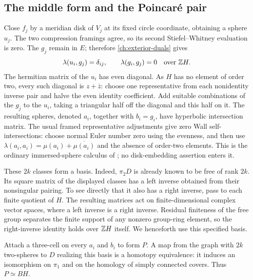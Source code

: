 \subsection{The middle form and the Poincar\'e pair}
\label{ch:duality}

Close $f_j$ by a meridian disk of $V_j$ at its fixed circle coordinate,
obtaining a sphere $u_j$.  The two compression framings agree, so its
second Stiefel--Whitney evaluation is zero.  The $g_j$ remain in $E$;
therefore \eqref{ch:exterior-duals} gives
\[
 \lambda(u_i,g_j)=\delta_{ij},\qquad \lambda(g_i,g_j)=0
 \quad\text{over }\mathbb Z H.
\]
The hermitian matrix of the $u_i$ has even diagonal.  As $H$ has no
element of order two, every such diagonal is $z+\bar z$: choose one
representative from each nonidentity inverse pair and halve the even
identity coefficient.  Add suitable combinations of the $g_j$ to the
$u_i$, taking a triangular half off the diagonal and this half on it.
The resulting spheres, denoted $a_i$, together with $b_i=g_i$, have
hyperbolic intersection matrix.  The usual framed representative
adjustments give zero Wall self-intersections: choose normal Euler
number zero using the evenness, and then use
$\lambda(a_i,a_i)=\mu(a_i)+\overline{\mu(a_i)}$ and the absence of
order-two elements.  This is the ordinary immersed-sphere calculus
of \cite{FQ}; no disk-embedding assertion enters it.

These $2k$ classes form a basis.  Indeed, $\pi_2D$ is already known
to be free of rank $2k$.  Its square matrix of the displayed classes
has a left inverse obtained from their nonsingular pairing.  To see
directly that it also has a right inverse, pass to each finite quotient
of $H$.  The resulting matrices act on finite-dimensional complex
vector spaces, where a left inverse is a right inverse.  Residual
finiteness of the free group separates the finite support of any
nonzero group-ring element, so the right-inverse identity holds over
$\mathbb Z H$ itself.  We henceforth use this specified basis.

Attach a three-cell on every $a_i$ and $b_i$ to form $P$.  A map from
the graph with $2k$ two-spheres to $D$ realizing this basis is a
homotopy equivalence: it induces an isomorphism on $\pi_1$ and on the
homology of simply connected covers.  Thus $P\simeq BH$.

